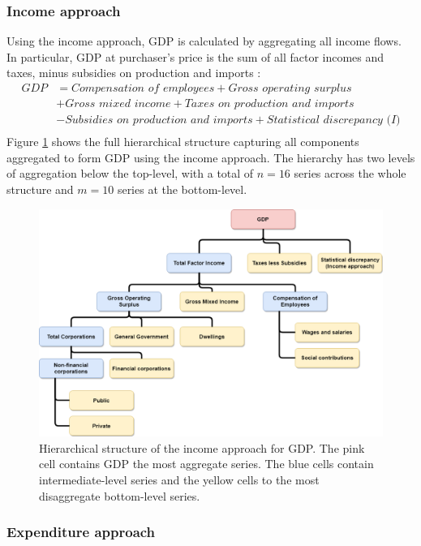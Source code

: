\documentclass[graybox]{svmult}
\begin{document}
\subsubsection*{Income approach}

Using the income approach, GDP is calculated by aggregating all income flows. In particular, GDP at purchaser's price is the sum of all factor incomes and taxes, minus subsidies on production and imports \citep{ABS2015}:
	\begin{align*}
	\textit{GDP} &= \textit{Compensation of employees} + \textit{Gross operating surplus}\\ &+ \textit{Gross mixed income}+ \textit{Taxes on production and imports}\\ &- \textit{Subsidies on production and imports} + \textit{Statistical discrepancy (I)}\\
	\end{align*}
Figure \ref{fig:GDP_I} shows the full hierarchical structure capturing all components aggregated to form GDP using the income approach. The hierarchy has two levels of aggregation below the top-level, with a total of $n=16$ series across the whole structure and $m=10$ series at the bottom-level.

\begin{figure}[t]
	\centering
	\includegraphics[width=\textwidth]{Figs/IncomeApproach.png}
	\caption{Hierarchical structure of the income approach for GDP. The pink cell contains GDP the most aggregate series. The blue cells contain intermediate-level series and the yellow cells to the most disaggregate bottom-level series.}\label{fig:GDP_I}
\end{figure}

\subsubsection*{Expenditure approach}
\end{document}
